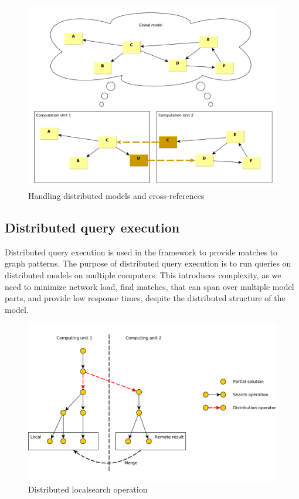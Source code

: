 \begin{figure}[h]
	\begin{center}
		\includegraphics[width=\textwidth]{figures/distributed-model-handling.pdf}
		\caption{Handling distributed models and cross-references}
		\label{fig:distributed-model-handling}
	\end{center}
\end{figure}



\subsection{Distributed query execution}

Distributed query execution is used in the framework to provide matches to graph patterns.
The purpose of distributed query execution is to run queries on distributed models on multiple computers. 
This introduces complexity, as we need to minimize network load, find matches, that can span over multiple model parts, and provide low response times, despite the distributed structure of the model.


\begin{figure}[h]
	\begin{center}
		\includegraphics[width=\textwidth]{figures/distributed-ls.pdf}
		\caption{Distributed localsearch operation}
		\label{fig:distributed-ls}
	\end{center}
\end{figure}

